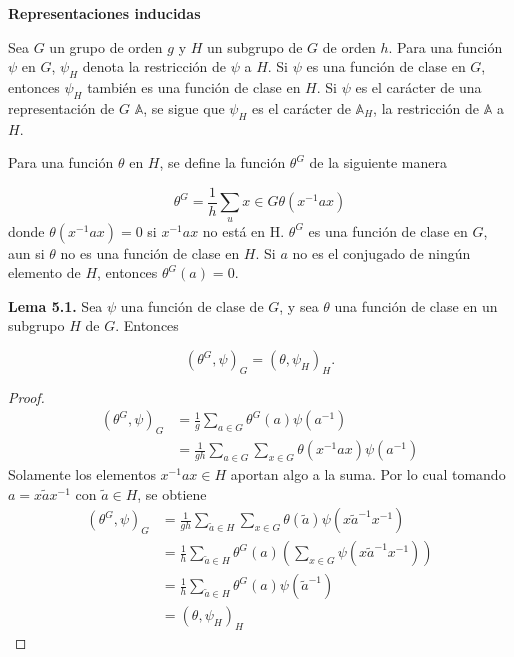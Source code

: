\documentclass[12pt]{book}
\theoremstyle{definition}
\newcounter{in}
\begin{document}
\textbf{Representaciones inducidas} 

Sea $G$ un grupo de orden $g$ y $H$ un subgrupo de $G$ de orden
$h$. Para una función $\psi$ en $G$, $\psi_{H}$ denota la restricción
de $\psi$ a $H$. Si $\psi$ es una función de clase en $G$, entonces
$\psi_{H}$ también es una función de clase en $H$. Si $\psi$ es el
carácter de una representación de $G$ $\mathbb{A}$, se sigue que
$\psi_{H}$ es el carácter de $\mathbb{A}_{H}$, la restricción de
$\mathbb{A}$ a $H$.

Para una función $\theta$ en $H$, se define la función $\theta^{G}$ de
la siguiente manera

\begin{equation*}
  \theta^{G}=\frac{1}{h} \sum_ u{x \in G} \theta(x^{-1}ax)
\end{equation*}
donde $\theta(x^{-1}ax)=0$ si $x^{-1}ax$ no está en H. $\theta^{G}$ es
una función de clase en $G$, aun si $\theta$ no es una función de
clase en $H$. Si $a$ no es el conjugado de ningún elemento de $H$,
entonces $\theta^{G}(a)=0$.

\textbf{Lema 5.1. } Sea $\psi$ una función de clase de $G$, y sea
$\theta$ una función de clase en un subgrupo $H$ de $G$. Entonces

\begin{equation*}
  (\theta^{G},\psi)_{G}= (\theta,\psi_{H})_{H} .
\end{equation*}

\begin{proof}
  \begin{equation*}
    \begin{aligned}
      (\theta^{G},\psi)_{G} &= \frac{1}{g} \sum_{a \in G} \theta^{G}(a) \psi(a^{-1})\\
      &= \frac{1}{gh} \sum_{a \in G} \sum_{x \in G} \theta(x^{-1}ax) \psi(a^{-1})
    \end{aligned}
  \end{equation*}  
  Solamente los elementos $x^{-1}ax \in H$ aportan algo a la suma. Por
  lo cual tomando $a=x \tilde{a} x^{-1}$ con $\tilde{a} \in H$, se
  obtiene
  \begin{equation*}
    \begin{aligned}
      (\theta^{G},\psi)_{G} &= \frac{1}{gh} \sum_{\tilde{a} \in H} \sum_{x \in G} \theta(\tilde{a}) \psi(x \tilde{a}^{-1} x^{-1})\\
      &= \frac{1}{h} \sum_{\tilde{a} \in H} \theta^{G}(a) (\sum_{x \in G} \psi(x \tilde{a}^{-1}x^{-1})) \\
      &= \frac{1}{h} \sum_{\tilde{a} \in H} \theta^{G}(a) \psi(\tilde{a}^{-1}) \\
      &=  (\theta,\psi_{H})_{H}
    \end{aligned}
  \end{equation*}
\end{proof}
\end{document}
